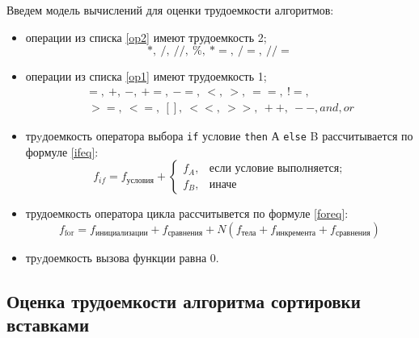 Введем модель вычислений для оценки трудоемкости алгоритмов:
\begin{itemize}[left=\parindent]
    \item операции из списка \ref{op2} имеют трудоемкость 2;
        \begin{equation}\label{op2}
            *,~/,~//,~\%,~*=,~/=,~//=
        \end{equation}

    \item операции из списка \ref{op1} имеют трудоемкость 1;
        \begin{equation}\label{op1}
            \begin{aligned}
                =,~+,~-,~+=,~-=,~<,~>,~==,~!=,\\
                ~>=, ~<=,~[],~<<,~>>,~++,~--,and,or
            \end{aligned}
        \end{equation}

    \item трyдоемкость оператора выбора \texttt{if} условие \texttt{then} А
        \texttt{else} B рассчитывается по формуле \ref{ifeq}:
        \begin{equation}\label{ifeq}
            f_{if} = f_{условия} +
            \begin{cases}
                f_A, & \text{если условие выполняется;}\\
                f_B, & \text{иначе}
            \end{cases}
        \end{equation}

    \item трудоемкость оператора цикла рассчитывется по формуле \ref{foreq}:
        \begin{equation}\label{foreq}
            f_{\text{for}} = f_{\text{инициализации}} + f_{\text{сравнения}} +
                      N(f_{\text{тела}} + f_{\text{инкремента}} +
                      f_{\text{сравнения}})
        \end{equation}

    \item трyдоемкость вызова функции равна 0.
\end{itemize}

\subsection{Оценка трудоемкости алгоритма сортировки вставками}

